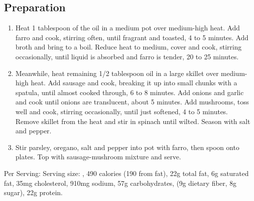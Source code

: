 \subsection{Preparation}
\begin{enumerate}
    \item Heat 1 tablespoon of the oil in a medium pot over medium-high heat. Add farro and cook, stirring often, until fragrant and toasted, 4 to 5 minutes. Add broth and bring to a boil. Reduce heat to medium, cover and cook, stirring occasionally, until liquid is absorbed and farro is tender, 20 to 25 minutes. 
    \item Meanwhile, heat remaining 1/2 tablespoon oil in a large skillet over medium-high heat. Add sausage and cook, breaking it up into small chunks with a spatula, until almost cooked through, 6 to 8 minutes. Add onions and garlic and cook until onions are translucent, about 5 minutes. Add mushrooms, toss well and cook, stirring occasionally, until just softened, 4 to 5 minutes. Remove skillet from the heat and stir in spinach until wilted. Season with salt and pepper.
    \item Stir parsley, oregano, salt and pepper into pot with farro, then spoon onto plates. Top with sausage-mushroom mixture and serve.
\end{enumerate}

Per Serving: Serving size: , 490 calories (190 from fat), 22g total fat, 6g saturated fat, 35mg cholesterol, 910mg sodium, 57g carbohydrates, (9g dietary fiber, 8g sugar), 22g protein.
